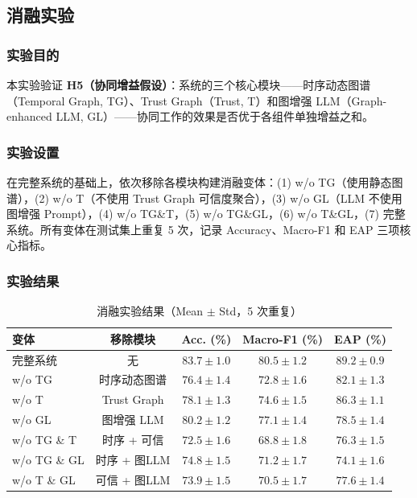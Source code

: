 \subsection{消融实验}
\label{sec:exp-ablation}

\subsubsection{实验目的}

本实验验证 \textbf{H5（协同增益假设）}：\projectshort 系统的三个核心模块——时序动态图谱（Temporal Graph, TG）、Trust Graph（Trust, T）和图增强 LLM（Graph-enhanced LLM, GL）——协同工作的效果是否优于各组件单独增益之和。

\subsubsection{实验设置}

在完整系统的基础上，依次移除各模块构建消融变体：(1) w/o TG（使用静态图谱），(2) w/o T（不使用 Trust Graph 可信度聚合），(3) w/o GL（LLM 不使用图增强 Prompt），(4) w/o TG\&T，(5) w/o TG\&GL，(6) w/o T\&GL，(7) 完整系统。所有变体在测试集上重复 5 次，记录 Accuracy、Macro-F1 和 EAP 三项核心指标。

\subsubsection{实验结果}

\begin{table}[H]
\centering
\caption{消融实验结果（Mean $\pm$ Std，5 次重复）}
\label{tab:exp-ablation}
\begin{tabularx}{0.95\linewidth}{l c c c c}
\toprule
\textbf{变体} & \textbf{移除模块} & \textbf{Acc. (\%)} & \textbf{Macro-F1 (\%)} & \textbf{EAP (\%)} \\
\midrule
完整系统 & 无 & $\mathbf{83.7 \pm 1.0}$ & $\mathbf{80.5 \pm 1.2}$ & $\mathbf{89.2 \pm 0.9}$ \\
w/o TG & 时序动态图谱 & $76.4 \pm 1.4$ & $72.8 \pm 1.6$ & $82.1 \pm 1.3$ \\
w/o T & Trust Graph & $78.1 \pm 1.3$ & $74.6 \pm 1.5$ & $86.3 \pm 1.1$ \\
w/o GL & 图增强 LLM & $80.2 \pm 1.2$ & $77.1 \pm 1.4$ & $78.5 \pm 1.4$ \\
w/o TG \& T & 时序 + 可信 & $72.5 \pm 1.6$ & $68.8 \pm 1.8$ & $76.3 \pm 1.5$ \\
w/o TG \& GL & 时序 + 图LLM & $74.8 \pm 1.5$ & $71.2 \pm 1.7$ & $74.1 \pm 1.6$ \\
w/o T \& GL & 可信 + 图LLM & $73.9 \pm 1.5$ & $70.5 \pm 1.7$ & $77.6 \pm 1.4$ \\
\bottomrule
\end{tabularx}
\end{table}


